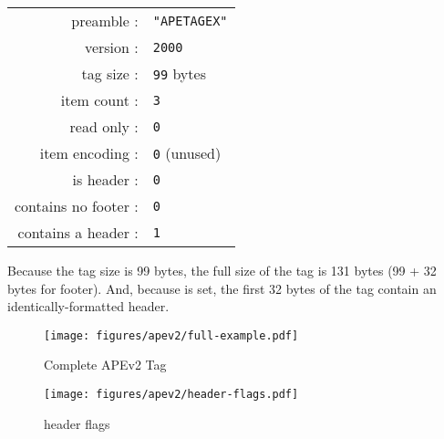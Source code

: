 \clearpage

\begin{tabular}{rl}
preamble : & \texttt{"APETAGEX"} \\
version : & \texttt{2000} \\
tag size : & \texttt{99} bytes \\
item count : & \texttt{3} \\
read only : & \texttt{0} \\
item encoding : & \texttt{0} (unused) \\
is header : & \texttt{0} \\
contains no footer : & \texttt{0} \\
contains a header : & \texttt{1} \\
\end{tabular}
\par
\noindent
Because the tag size is 99 bytes, the full size of the tag
is 131 bytes (99 + 32 bytes for footer).
And, because  is set,
the first 32 bytes of the tag contain an identically-formatted header.

\begin{figure}[h]
  \texttt{[image: figures/apev2/full-example.pdf]}
  \caption{Complete APEv2 Tag}
\end{figure}
\begin{figure}[h]
  \texttt{[image: figures/apev2/header-flags.pdf]}
  \caption{header flags}
\end{figure}

\clearpage

